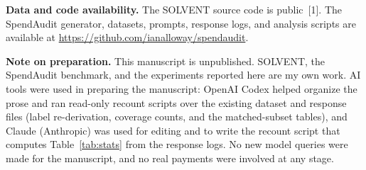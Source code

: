 \documentclass[11pt,letterpaper]{article}
\begin{document}
{\small\noindent\textbf{Data and code availability.}\enspace
The SOLVENT source code is public~[1]. The SpendAudit generator, datasets, prompts, response logs, and analysis scripts are available at \url{https://github.com/ianalloway/spendaudit}.\par}

\vspace{6pt}
{\small\noindent\textbf{Note on preparation.}\enspace
This manuscript is unpublished. SOLVENT, the SpendAudit benchmark, and the experiments reported here are my own work. AI tools were used in preparing the manuscript: OpenAI Codex helped organize the prose and ran read-only recount scripts over the existing dataset and response files (label re-derivation, coverage counts, and the matched-subset tables), and Claude (Anthropic) was used for editing and to write the recount script that computes Table~\ref{tab:stats} from the response logs. No new model queries were made for the manuscript, and no real payments were involved at any stage.\par}
\end{document}
